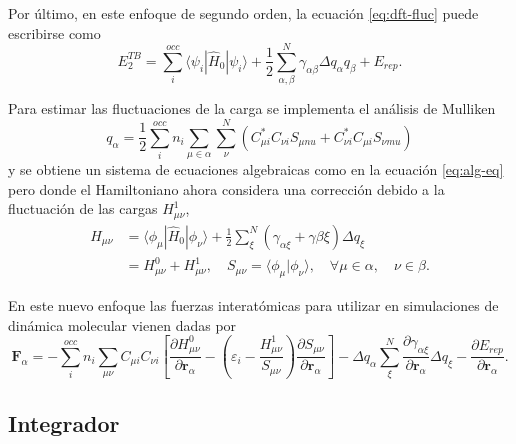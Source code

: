 \begin{enumerate}
        Por último, en este enfoque de segundo orden, la ecuación 
        \ref{eq:dft-fluc} puede escribirse como
        \begin{equation*}
        E_2^{TB} = \sum_i^{occ} \langle \psi_i | \hat{H}_0 | \psi_i \rangle + \frac{1}{2} \sum_{\alpha, \beta}^N \gamma_{\alpha\beta} \Delta q_{\alpha} q_{\beta} + E_{rep}.
        \end{equation*}

        Para estimar las fluctuaciones de la carga se implementa el análisis de
        Mulliken
        \begin{equation*}
        q_{\alpha} = \frac{1}{2} \sum_i^{occ} n_i \sum_{\mu \in \alpha} \sum_{\nu}^N (C_{\mu i}^{*} C_{\nu i} S_{\mu nu} + C_{\nu i}^{*} C_{\mu i} S_{\nu mu})
        \end{equation*}
        y se obtiene un sistema de ecuaciones algebraicas como en la ecuación
        \ref{eq:alg-eq} pero donde el Hamiltoniano ahora considera una 
        corrección debido a la fluctuación de las cargas $H_{\mu \nu}^1$,
        \begin{equation*}
            \begin{aligned}
                H_{\mu \nu} &= \langle \phi_{\mu} | \hat{H}_0 | \phi_{\nu} \rangle + \frac{1}{2}\sum_{\xi}^N (\gamma_{\alpha\xi} + \gamma{\beta\xi}) \Delta q_{\xi} \\
                &= H_{\mu\nu}^0 + H_{\mu\nu}^1, \quad S_{\mu\nu} = \langle \phi_{\mu} | \phi_{\nu} \rangle, \quad \forall \mu \in \alpha, \quad \nu \in \beta.
            \end{aligned}
        \end{equation*}

        En este nuevo enfoque las fuerzas interatómicas para utilizar en 
        simulaciones de dinámica molecular vienen dadas por
        \begin{equation*}
        \mathbf{F}_{\alpha} = - \sum_i^{occ} n_i \sum_{\mu\nu} C_{\mu i} C_{\nu i} \left[\frac{\partial H_{\mu\nu}^0}{\partial \mathbf{r}_{\alpha}} - \left(\varepsilon_i - \frac{H_{\mu\nu}^1}{S_{\mu\nu}}\right) \frac{\partial S_{\mu\nu}}{\partial \mathbf{r}_{\alpha}} \right] - \Delta q_{\alpha} \sum_{\xi}^N \frac{\partial \gamma_{\alpha\xi}}{\partial \mathbf{r}_{\alpha}} \Delta q_{\xi} - \frac{\partial E_{rep}}{\partial \mathbf{r}_{\alpha}}.
        \end{equation*}
 
\end{enumerate}

\subsection{Integrador}


